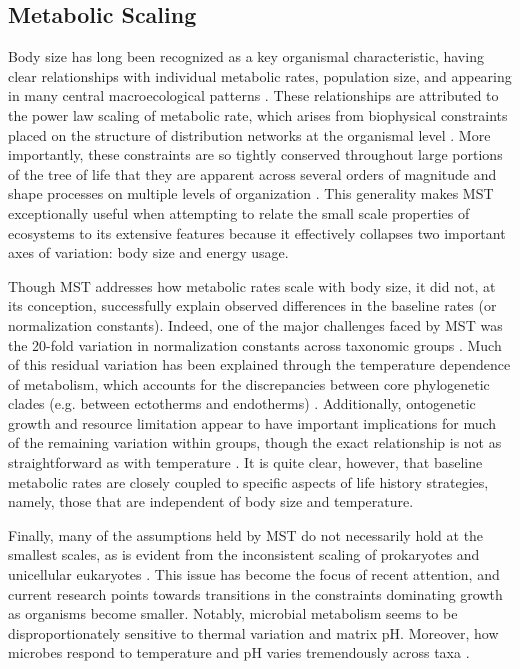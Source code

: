 \subsection{Metabolic Scaling}

Body size has long been recognized as a key organismal characteristic, having clear relationships with individual metabolic rates, population size, and appearing in many central macroecological patterns \cite{brown2004a, allen2005a, hatton2019a}. These relationships are attributed to the power law scaling of metabolic rate, which arises from biophysical constraints placed on the structure of distribution networks at the organismal level \cite{west_general_1997, brown2004a, savage_sizing_2008}. More importantly, these constraints are so tightly conserved throughout large portions of the tree of life that they are apparent across several orders of magnitude and shape processes on multiple levels of organization \cite{hatton2019a}. This generality makes MST exceptionally useful when attempting to relate the small scale properties of ecosystems to its extensive features because it effectively collapses two important axes of variation: body size and energy usage.

Though MST addresses how metabolic rates scale with body size, it did not, at its conception, successfully explain observed differences in the baseline rates (or normalization constants). Indeed, one of the major challenges faced by MST was the 20-fold variation in normalization constants across taxonomic groups \cite{brown2004a}. Much of this residual variation has been explained through the temperature dependence of metabolism, which accounts for the discrepancies between core phylogenetic clades (e.g. between ectotherms and endotherms) \cite{savage_sizing_2008, smith_systematic_2021, cook_id_thermodynamic_2021}. Additionally, ontogenetic growth and resource limitation appear to have important implications for much of the remaining variation within groups, though the exact relationship is not as straightforward as with temperature \cite{huang_water_2020}. It is quite clear, however, that baseline metabolic rates are closely coupled to specific aspects of life history strategies, namely, those that are independent of body size and temperature.

Finally, many of the assumptions held by MST do not necessarily hold at the smallest scales, as is evident from the inconsistent scaling of prokaryotes and unicellular eukaryotes \cite{delong_shifts_2010}. This issue has become the focus of recent attention, and current research points towards transitions in the constraints dominating growth as organisms become smaller. Notably, microbial metabolism seems to be disproportionately sensitive to thermal variation and matrix pH. Moreover, how microbes respond to temperature and pH varies tremendously across taxa \cite{jin2018a, smith_systematic_2021, garc2023a}.

